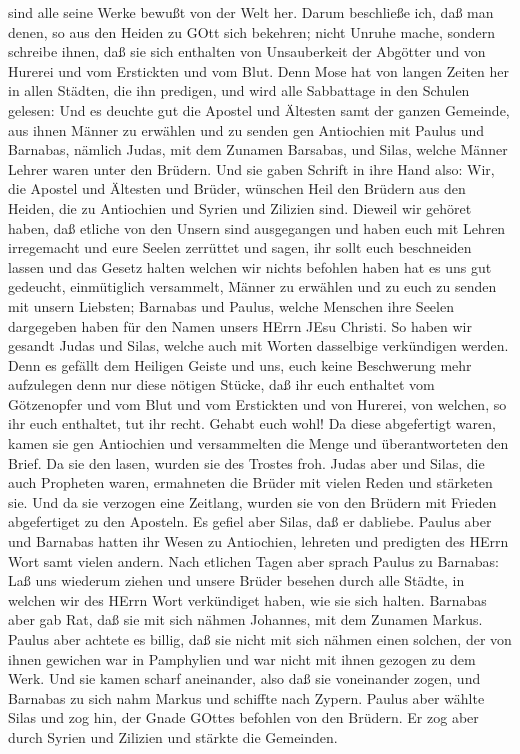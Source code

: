 sind alle seine Werke bewußt von der Welt her.  Darum
beschließe ich, daß man denen, so aus den Heiden zu GOtt sich bekehren;
nicht Unruhe mache,  sondern schreibe ihnen, daß sie sich
enthalten von Unsauberkeit der Abgötter und von Hurerei und vom
Erstickten und vom Blut.  Denn Mose hat von langen Zeiten
her in allen Städten, die ihn predigen, und wird alle Sabbattage in den
Schulen gelesen:  Und es deuchte gut die Apostel und
Ältesten samt der ganzen Gemeinde, aus ihnen Männer zu erwählen und zu
senden gen Antiochien mit Paulus und Barnabas, nämlich Judas, mit dem
Zunamen Barsabas, und Silas, welche Männer Lehrer waren unter den
Brüdern.  Und sie gaben Schrift in ihre Hand also: Wir, die
Apostel und Ältesten und Brüder, wünschen Heil den Brüdern aus den
Heiden, die zu Antiochien und Syrien und Zilizien sind. 
Dieweil wir gehöret haben, daß etliche von den Unsern sind ausgegangen
und haben euch mit Lehren irregemacht und eure Seelen zerrüttet und
sagen, ihr sollt euch beschneiden lassen und das Gesetz halten welchen
wir nichts befohlen haben  hat es uns gut gedeucht,
einmütiglich versammelt, Männer zu erwählen und zu euch zu senden mit
unsern Liebsten; Barnabas und Paulus,  welche Menschen ihre
Seelen dargegeben haben für den Namen unsers HErrn JEsu Christi.
 So haben wir gesandt Judas und Silas, welche auch mit
Worten dasselbige verkündigen werden.  Denn es gefällt dem
Heiligen Geiste und uns, euch keine Beschwerung mehr aufzulegen denn nur
diese nötigen Stücke,  daß ihr euch enthaltet vom
Götzenopfer und vom Blut und vom Erstickten und von Hurerei, von
welchen, so ihr euch enthaltet, tut ihr recht. Gehabt euch wohl!
 Da diese abgefertigt waren, kamen sie gen Antiochien und
versammelten die Menge und überantworteten den Brief.  Da
sie den lasen, wurden sie des Trostes froh.  Judas aber und
Silas, die auch Propheten waren, ermahneten die Brüder mit vielen Reden
und stärketen sie.  Und da sie verzogen eine Zeitlang,
wurden sie von den Brüdern mit Frieden abgefertiget zu den Aposteln.
 Es gefiel aber Silas, daß er dabliebe. 
Paulus aber und Barnabas hatten ihr Wesen zu Antiochien, lehreten und
predigten des HErrn Wort samt vielen andern.  Nach etlichen
Tagen aber sprach Paulus zu Barnabas: Laß uns wiederum ziehen und unsere
Brüder besehen durch alle Städte, in welchen wir des HErrn Wort
verkündiget haben, wie sie sich halten.  Barnabas aber gab
Rat, daß sie mit sich nähmen Johannes, mit dem Zunamen Markus.
 Paulus aber achtete es billig, daß sie nicht mit sich
nähmen einen solchen, der von ihnen gewichen war in Pamphylien und war
nicht mit ihnen gezogen zu dem Werk.  Und sie kamen scharf
aneinander, also daß sie voneinander zogen, und Barnabas zu sich nahm
Markus und schiffte nach Zypern.  Paulus aber wählte Silas
und zog hin, der Gnade GOttes befohlen von den Brüdern.  Er
zog aber durch Syrien und Zilizien und stärkte die Gemeinden.

